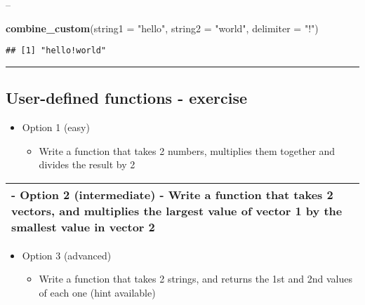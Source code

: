 \documentclass[]{article}
\newenvironment{Shaded}{\begin{snugshade}}{\end{snugshade}}
\newcommand{\DataTypeTok}[1]{\textcolor[rgb]{0.13,0.29,0.53}{#1}}
\newcommand{\KeywordTok}[1]{\textcolor[rgb]{0.13,0.29,0.53}{\textbf{#1}}}
\newcommand{\NormalTok}[1]{#1}
\newcommand{\StringTok}[1]{\textcolor[rgb]{0.31,0.60,0.02}{#1}}
\providecommand{\tightlist}{%
  \setlength{\itemsep}{0pt}\setlength{\parskip}{0pt}}
\begin{document}
--

\begin{Shaded}
\begin{Highlighting}[]
\KeywordTok{combine_custom}\NormalTok{(}\DataTypeTok{string1 =} \StringTok{"hello"}\NormalTok{,}
               \DataTypeTok{string2 =} \StringTok{"world"}\NormalTok{,}
               \DataTypeTok{delimiter =} \StringTok{"!"}\NormalTok{)}
\end{Highlighting}
\end{Shaded}

\begin{verbatim}
## [1] "hello!world"
\end{verbatim}

\begin{center}\rule{0.5\linewidth}{\linethickness}\end{center}

\hypertarget{user-defined-functions---exercise}{%
\subsection{User-defined functions -
exercise}\label{user-defined-functions---exercise}}

\begin{itemize}
\tightlist
\item
  Option 1 (easy)

  \begin{itemize}
  \tightlist
  \item
    Write a function that takes 2 numbers, multiplies them together and
    divides the result by 2
  \end{itemize}
\end{itemize}

\begin{longtable}[]{@{}l@{}}
\toprule
\endhead
\begin{minipage}[t]{0.04\columnwidth}\raggedright
- Option 2 (intermediate) - Write a function that takes 2 vectors, and
multiplies the largest value of vector 1 by the smallest value in vector
2\strut
\end{minipage}\tabularnewline
\bottomrule
\end{longtable}

\begin{itemize}
\tightlist
\item
  Option 3 (advanced)

  \begin{itemize}
  \tightlist
  \item
    Write a function that takes 2 strings, and returns the 1st and 2nd
    values of each one (hint available)
  \end{itemize}
\end{itemize}
\end{document}

